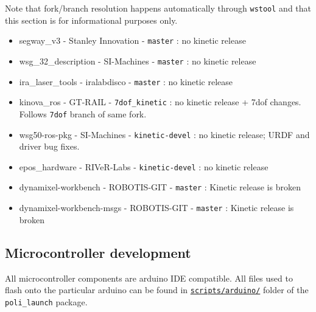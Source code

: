 Note that fork/branch resolution happens automatically through \texttt{wstool} and that this section is for informational purposes only.

\begin{itemize}
   \item segway\_v3 - Stanley Innovation - \texttt{master} : no kinetic release
   \item wsg\_32\_description - SI-Machines - \texttt{master} : no kinetic release
   \item ira\_laser\_tools - iralabdisco - \texttt{master} : no kinetic release
   \item kinova\_ros - GT-RAIL - \texttt{7dof\_kinetic} : no kinetic release + 7dof changes. Follows \texttt{7dof} branch of same fork.
   \item wsg50-ros-pkg - SI-Machines - \texttt{kinetic-devel} : no kinetic release; URDF and driver bug fixes.
   \item epos\_hardware - RIVeR-Labs - \texttt{kinetic-devel} : no kinetic release
   \item dynamixel-workbench - ROBOTIS-GIT - \texttt{master} : Kinetic release is broken
   \item dynamixel-workbench-msgs - ROBOTIS-GIT - \texttt{master} : Kinetic release is broken
\end{itemize}

\subsection{Microcontroller development}
All microcontroller components are arduino IDE compatible. 
All files used to flash onto the particular arduino can be found in \href{https://github.com/si-machines/poli2/tree/master/poli_launch/scripts/arduino}{\texttt{scripts/arduino/}} folder of the \texttt{poli\_launch} package.

